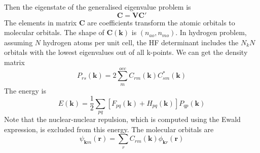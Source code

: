 \documentclass{article}
\begin{document}
        Then the eigenstate of the generalised eigenvalue problem is
        \begin{equation}
            \textbf{C} = \textbf{V}\textbf{C}'
        \end{equation}
        The elements in matrix $\textbf{C}$ are coefficients transform the atomic orbitals to molecular orbitals.
        The shape of $\textbf{C}(\textbf{k})$ is $(n_{ao}, n_{mo})$.
        In hydrogen problem, assuming $N$ hydrogen atoms per unit cell, 
        the HF determinant includes the $N_kN$ orbitals with the lowest eigenvalues out of all k-points.
        We can get the density matrix
        \begin{equation}
            P_{rs}(\textbf{k}) = 2\sum_m^{occ}C_{rm}(\textbf{k})C_{sm}^*(\textbf{k})
        \end{equation}
        The energy is
        \begin{equation}
            E(\textbf{k}) = \frac{1}{2}\sum_{pq}\left[F_{pq}(\textbf{k})+H_{pq}(\textbf{k})\right]P_{qp}(\textbf{k})
        \end{equation}
        Note that the nuclear-nuclear repulsion,
        which is computed using the Ewald expression, is excluded from this energy.
        The molecular orbitals are
        \begin{equation}
            \psi_{\textbf{k}m}(\textbf{r}) = \sum_{r}C_{rm}(\textbf{k})\phi_{\textbf{k}r}(\textbf{r})
        \end{equation} 




\end{document}
